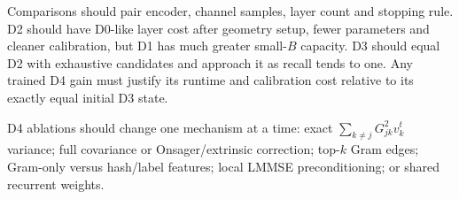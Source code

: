 \documentclass[11pt]{article}
\begin{document}
Comparisons should pair encoder, channel samples, layer count and stopping rule. D2 should have D0-like layer cost after
geometry setup, fewer parameters and cleaner calibration, but D1 has much greater small-$B$ capacity. D3 should equal
D2 with exhaustive candidates and approach it as recall tends to one. Any trained D4 gain must justify its runtime and
calibration cost relative to its exactly equal initial D3 state.

D4 ablations should change one mechanism at a time: exact $\sum_{k\ne j}G_{jk}^2v_k^t$ variance; full covariance or
Onsager/extrinsic correction; top-$k$ Gram edges; Gram-only versus hash/label features; local LMMSE preconditioning; or
shared recurrent weights.

\end{document}
